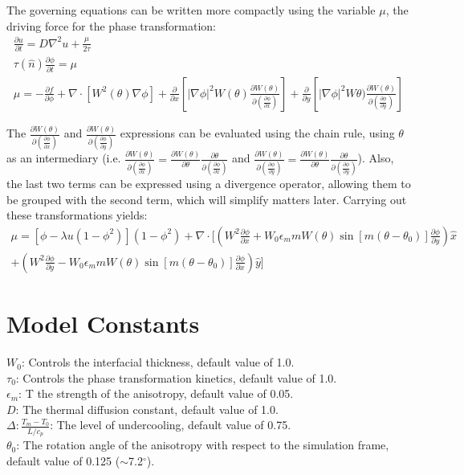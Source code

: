 \documentclass[10pt]{article}
\begin{document}
The governing equations can be written more compactly using the variable $\mu$, the driving force for the phase transformation:
\begin{gather}
\frac{\partial u}{\partial t} = D \nabla^2 u + \frac{\mu}{2 \tau} \\
\tau(\hat{n}) \frac{\partial \phi}{\partial t} = \mu \\
\mu = -\frac{\partial f}{\partial \phi} + \nabla \cdot \left[W^2(\theta) \nabla \phi \right]+  \frac{\partial}{\partial x} \left[ |\nabla \phi|^2 W(\theta) \frac{\partial W(\theta)}{\partial \left( \frac{\partial \phi}{\partial x} \right)} \right] + \frac{\partial}{\partial y} \left[ |\nabla \phi|^2 W\theta) \frac{\partial W(\theta)}{\partial \left( \frac{\partial \phi}{\partial y} \right)} \right] 
\end{gather}

The  $\frac{\partial W(\theta)}{\partial \left( \frac{\partial \phi}{\partial x} \right)}$ and $\frac{\partial W(\theta)}{\partial \left( \frac{\partial \phi}{\partial y} \right)}$ expressions can be evaluated using the chain rule, using $\theta$ as an intermediary (i.e. $\frac{\partial W(\theta)}{\partial \left( \frac{\partial \phi}{\partial x} \right)}=\frac{\partial W(\theta)}{\partial \theta} \frac{\partial \theta}{\partial \left( \frac{\partial \phi}{\partial x} \right)}$  and $\frac{\partial W(\theta)}{\partial \left( \frac{\partial \phi}{\partial y} \right)}=\frac{\partial W(\theta)}{\partial \theta} \frac{\partial \theta}{\partial \left( \frac{\partial \phi}{\partial y} \right)}$). Also, the last two terms can be expressed using a divergence operator, allowing them to be grouped with the second term, which will simplify matters later. Carrying out these transformations yields:
\begin{multline}
\mu = \left[ \phi - \lambda u \left(1 - \phi^2 \right) \right] \left(1-\phi^2\right) + \nabla \cdot \bigg[\left(W^2 \frac{\partial \phi}{\partial x} + W_0 \epsilon_m m W(\theta) \sin \left[ m \left(\theta - \theta_0 \right) \right] \frac{\partial \phi}{\partial y}\right)\hat{x}  \\
+ \left(W^2 \frac{\partial \phi}{\partial y} -W_0 \epsilon_m m W(\theta) \sin \left[ m \left(\theta - \theta_0 \right) \right] \frac{\partial \phi}{\partial x}\right) \hat{y} \bigg]
\end{multline}

\section{Model Constants}
$W_0$: Controls the interfacial thickness, default value of 1.0. \\
$\tau_0$: Controls the phase transformation kinetics, default value of 1.0. \\
$\epsilon_m$: T the strength of the anisotropy, default value of 0.05. \\
$D$: The thermal diffusion constant, default value of 1.0. \\
$\Delta: \frac{T_m-T_0}{L/c_p}$: The level of undercooling, default value of 0.75. \\
$\theta_0$: The rotation angle of the anisotropy with respect to the simulation frame, default value of 0.125 ($\sim$7.2$^\circ$).
\end{document}
